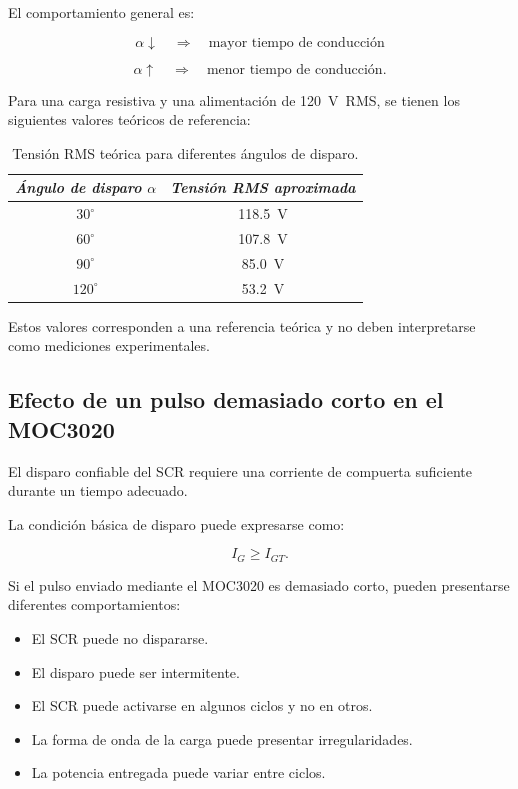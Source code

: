 \documentclass[12pt]{article}
\begin{document}
El comportamiento general es:

\[
\alpha\downarrow
\quad\Rightarrow\quad
\text{mayor tiempo de conducción}
\]

\[
\alpha\uparrow
\quad\Rightarrow\quad
\text{menor tiempo de conducción}.
\]

Para una carga resistiva y una alimentación de \SI{120}{V RMS}, se tienen
los siguientes valores teóricos de referencia:

\begin{table}[H]
\centering
\caption{Tensión RMS teórica para diferentes ángulos de disparo.}
\label{tRMS}
\begin{tabular}{cc}
\toprule
\textit{Ángulo de disparo $\alpha$} &
\textit{Tensión RMS aproximada} \\
\midrule
$30^\circ$ & \SI{118.5}{V} \\
$60^\circ$ & \SI{107.8}{V} \\
$90^\circ$ & \SI{85.0}{V} \\
$120^\circ$ & \SI{53.2}{V} \\
\bottomrule
\end{tabular}
\end{table}

Estos valores corresponden a una referencia teórica y no deben interpretarse
como mediciones experimentales.

\subsection{Efecto de un pulso demasiado corto en el MOC3020}

El disparo confiable del SCR requiere una corriente de compuerta suficiente
durante un tiempo adecuado.

La condición básica de disparo puede expresarse como:

\begin{equation}
I_G\geq I_{GT}.
\end{equation}

Si el pulso enviado mediante el MOC3020 es demasiado corto, pueden
presentarse diferentes comportamientos:

\begin{itemize}
    \item El SCR puede no dispararse.
    \item El disparo puede ser intermitente.
    \item El SCR puede activarse en algunos ciclos y no en otros.
    \item La forma de onda de la carga puede presentar irregularidades.
    \item La potencia entregada puede variar entre ciclos.
\end{itemize}
\end{document}
